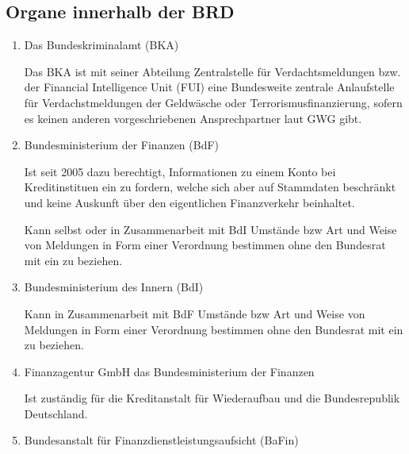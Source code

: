 \documentclass{article}
\begin{document}
        \subsection[Organe BRD]{Organe innerhalb der BRD}

            \begin{enumerate}

                \item Das Bundeskriminalamt (BKA)

                    Das BKA ist mit seiner Abteilung Zentralstelle für Verdachtsmeldungen bzw. der Financial Intelligence Unit (FUI) eine Bundesweite zentrale Anlaufstelle für Verdachstmeldungen der Geldwäsche oder Terrorismusfinanzierung, sofern es keinen anderen vorgeschriebenen Ansprechpartner laut GWG gibt.

                \item Bundesministerium der Finanzen (BdF)

                    Ist seit 2005 dazu berechtigt, Informationen zu einem Konto bei Kreditinstituen ein zu fordern, welche sich aber auf Stammdaten beschränkt und keine Auskunft über den eigentlichen Finanzverkehr beinhaltet. \cite{Tätigkeitsbericht}

                    Kann selbst oder in Zusammenarbeit mit BdI Umstände bzw Art und Weise von Meldungen in Form einer Verordnung bestimmen ohne den Bundesrat mit ein zu beziehen.

                \item Bundesministerium des Innern (BdI)

                    Kann in Zusammenarbeit mit BdF Umstände bzw Art und Weise von Meldungen in Form einer Verordnung bestimmen ohne den Bundesrat mit ein zu beziehen.                

                \item Finanzagentur GmbH das Bundesministerium der Finanzen

                    Ist zuständig für die Kreditanstalt für Wiederaufbau und die Bundesrepublik Deutschland.

                \item Bundesanstalt für Finanzdienstleistungsaufsicht (BaFin)


\end{enumerate}
\end{document}
